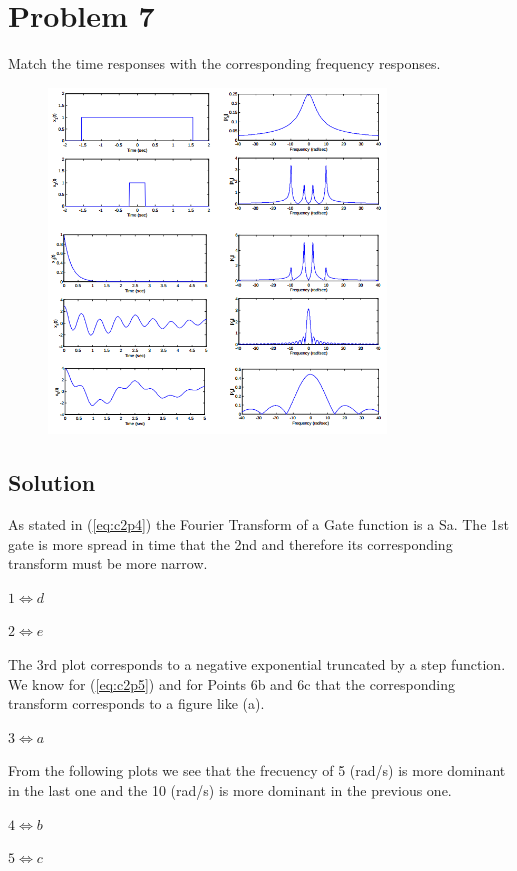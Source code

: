 \section*{Problem 7}

Match the time responses with the corresponding frequency responses.

\begin{figure}[H]
\caption*{}
\centering
\includegraphics[width=0.8\textwidth]{figs/c2p7.png}
\label{fig:c2p7}
\end{figure} 

\subsection*{Solution}

As stated in (\ref{eq:c2p4}) the Fourier Transform of a Gate function is 
a Sa. The 1st gate is more spread in time that the 2nd and therefore
its corresponding transform must be more narrow. 

$1 \Leftrightarrow d $

$2 \Leftrightarrow e $

The 3rd plot corresponds to a negative exponential truncated by a step function.
We know for (\ref{eq:c2p5}) and for Points 6b and 6c that the corresponding 
transform corresponds to a figure like (a).

$3 \Leftrightarrow a $

From the following plots we see that the frecuency of 5 (rad/s) is more dominant
in the last one and the 10 (rad/s) is more dominant in the previous one.

$4 \Leftrightarrow b $

$5 \Leftrightarrow c $

